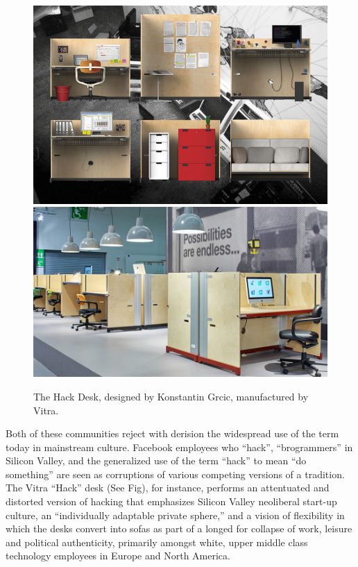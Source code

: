 \documentclass[10pt,letter,oneside]{scrartcl}
\begin{document}
\begin{figure} \centering
\includegraphics[scale=0.6]{images/Workspirit13HACKStudioAKFB3}
\includegraphics[scale=0.4]{images/HackDeskGrcic} \caption{The Hack Desk,
designed by Konstantin Grcic, manufactured by Vitra.} \label{fig:hackdeskimage}
\end{figure}

Both of these communities reject with derision the widespread use of the term
today in mainstream culture.  Facebook employees who ``hack'', ``brogrammers''
in Silicon Valley, and the generalized use of the term ``hack'' to mean ``do
something'' are seen as corruptions of various competing versions of a
tradition.   The Vitra ``Hack'' desk (See Fig), for instance, performs an
attentuated and distorted version of hacking that emphasizes Silicon Valley
neoliberal start-up culture, an ``individually adaptable private sphere,'' and
a vision of flexibility in which the desks convert into sofas as part of a
longed for collapse of work, leisure and political authenticity, primarily
amongst white, upper middle class technology employees in Europe and North
America. 
\end{document}
